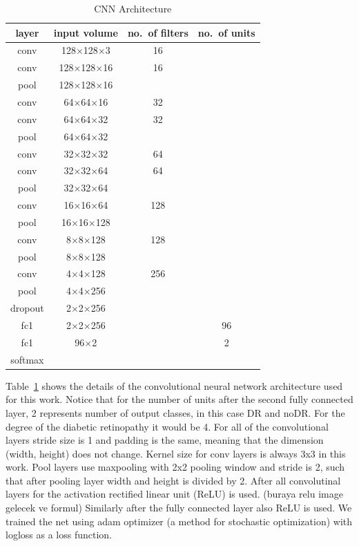 \begin{table}[t]
\centering
\caption{CNN Architecture} \label{tab:cnnarc}
\begin{tabular}{|c|c|c|c|} \hline
\textbf{layer} & \textbf{input volume} & \textbf{no.\ of filters} & \textbf{no.\ of units} \\ \hline
conv & 128$\times$128$\times$3 & 16 & \\ \hline
conv & 128$\times$128$\times$16 & 16 & \\ \hline
pool & 128$\times$128$\times$16 &  & \\ \hline
conv & 64$\times$64$\times$16 & 32 & \\ \hline
conv & 64$\times$64$\times$32 & 32 & \\ \hline
pool & 64$\times$64$\times$32 &  & \\ \hline
conv & 32$\times$32$\times$32 & 64  & \\ \hline
conv & 32$\times$32$\times$64 & 64  & \\ \hline
pool & 32$\times$32$\times$64 &   & \\ \hline
conv & 16$\times$16$\times$64 & 128  & \\ \hline
pool & 16$\times$16$\times$128 &   & \\ \hline
conv & 8$\times$8$\times$128 & 128  & \\ \hline
pool & 8$\times$8$\times$128 &   & \\ \hline
conv & 4$\times$4$\times$128 & 256  & \\ \hline
pool & 4$\times$4$\times$256 &   & \\ \hline
dropout & 2$\times$2$\times$256 & & \\ \hline
fc1 & 2$\times$2$\times$256 & &96 \\ \hline
fc1 & 96$\times$2 & &2 \\ \hline
softmax & & & \\ \hline
\end{tabular}
\end{table}

Table~\ref{tab:cnnarc} shows the details of the convolutional neural network architecture used for this work. Notice that for the number of units after the second fully connected layer, 2 represents number of output classes, in this case DR and noDR. For the degree of the diabetic retinopathy it would be 4. For all of the convolutional layers stride size is 1 and padding is the same, meaning that the dimension (width, height) does not change. Kernel size for conv layers is always 3x3 in this work. Pool layers use maxpooling with 2x2 pooling window and stride is 2, such that after pooling layer width and height is divided by 2. After all convolutinal layers for the activation rectified linear unit (ReLU) is used. (buraya relu image gelecek ve formul) Similarly after the fully connected layer also ReLU is used. 
We trained the net using adam optimizer (a method for stochastic optimization) \citep{kingma2014adam} with logloss as a loss function. 
